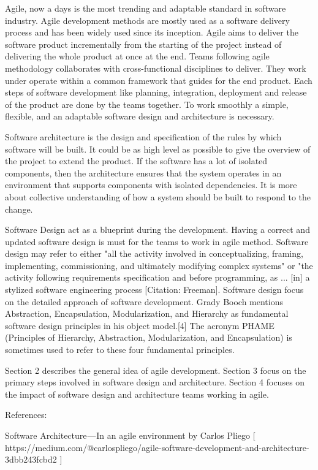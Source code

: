 Agile, now a days is the most trending and adaptable standard in software industry. Agile development methods are mostly used as a software delivery process and has been widely used since its inception. Agile aims to deliver the software product incrementally from the starting of the project instead of delivering the whole product at once at the end. Teams following agile methodology collaborates with cross-functional disciplines to deliver. They work under operate within a common framework that guides for the end product. Each steps of software development like planning, integration, deployment and release of the product are done by the teams together. To work smoothly a simple, flexible, and an adaptable software design and architecture is necessary. 


Software architecture is the design and specification of the rules by which software will be built. It could be as high level as possible to give the overview of the project to extend the product. If the software has a lot of isolated components, then the architecture ensures that the system operates in an environment that supports components with isolated dependencies. It is more about collective understanding of how a system should be built to respond to the change.

Software Design act as a blueprint during the development. Having a correct and updated software design is must for the teams to work in agile method.
Software design may refer to either "all the activity involved in conceptualizing, framing, implementing, commissioning, and ultimately modifying complex systems" or "the activity following requirements specification and before programming, as ... [in] a stylized software engineering process [Citation: Freeman]. 
Software design focus on the detailed approach of software development. Grady Booch mentions Abstraction, Encapsulation, Modularization, and Hierarchy as fundamental software design principles in his object model.[4] The acronym PHAME (Principles of Hierarchy, Abstraction, Modularization, and Encapsulation) is sometimes used to refer to these four fundamental principles.

Section 2 describes the general idea of agile 
development. Section 3 focus on the primary steps involved in software design and architecture. Section 4 focuses on the impact of software design and architecture teams working in agile.



References:

Software Architecture — In an agile environment by Carlos Pliego [ https://medium.com/@carlospliego/agile-software-development-and-architecture-3dbb243fcbd2 ]

